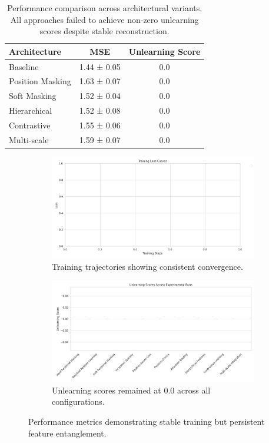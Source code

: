 \documentclass{article} %
\begin{document}
\begin{table}[h]
\centering
\begin{tabular}{lcc}
\toprule
Architecture & MSE & Unlearning Score \\
\midrule
Baseline & 1.44 ± 0.05 & 0.0 \\
Position Masking & 1.63 ± 0.07 & 0.0 \\
Soft Masking & 1.52 ± 0.04 & 0.0 \\
Hierarchical & 1.52 ± 0.08 & 0.0 \\
Contrastive & 1.55 ± 0.06 & 0.0 \\
Multi-scale & 1.59 ± 0.07 & 0.0 \\
\bottomrule
\end{tabular}
\caption{Performance comparison across architectural variants. All approaches failed to achieve non-zero unlearning scores despite stable reconstruction.}
\label{tab:architecture_comparison}
\end{table}

\begin{figure}[h]
\centering
\begin{subfigure}{0.49\textwidth}
    \includegraphics[width=\textwidth]{loss_curves.png}
    \caption{Training trajectories showing consistent convergence.}
    \label{fig:loss_curves}
\end{subfigure}
\hfill
\begin{subfigure}{0.49\textwidth}
    \includegraphics[width=\textwidth]{unlearning_scores.png}
    \caption{Unlearning scores remained at 0.0 across all configurations.}
    \label{fig:unlearning_scores}
\end{subfigure}
\caption{Performance metrics demonstrating stable training but persistent feature entanglement.}
\label{fig:performance_metrics}
\end{figure}
\end{document}
